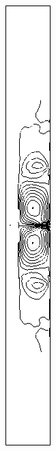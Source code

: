 \begin{figure}[h]
\begin{subfigure}[b]{0.13\textwidth}
\caption{ }
\end{subfigure}
\begin{subfigure}[b]{0.13\textwidth}
\centering
\includegraphics[width=\textwidth]{png/cranium/2d-sxy-single-comp-02.png}

\end{subfigure}
\end{figure}
